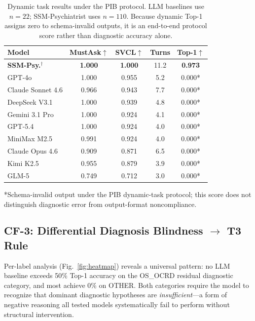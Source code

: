 \documentclass[conference]{IEEEtran}
\begin{document}
\begin{table}[htbp]
\caption{Dynamic task results under the PIB protocol. LLM baselines use $n=22$; SSM-Psychiatrist uses $n=110$. Because dynamic Top-1 assigns zero to schema-invalid outputs, it is an end-to-end protocol score rather than diagnostic accuracy alone.}
\label{tab:dynamic}
\begin{center}
\begin{tabular}{lcccc}
\toprule
\textbf{Model} & \textbf{MustAsk$\uparrow$} & \textbf{SVCL$\uparrow$} & \textbf{Turns} & \textbf{Top-1$\uparrow$} \\
\midrule
\rowcolor[gray]{0.88}
\textbf{SSM-Psy.}$^\dagger$ & \textbf{1.000} & \textbf{1.000} & 11.2 & \textbf{0.973} \\
\midrule
GPT-4o            & 1.000 & 0.955 & 5.2 & 0.000* \\
Claude Sonnet 4.6 & 0.966 & 0.943 & 7.7 & 0.000* \\
DeepSeek V3.1     & 1.000 & 0.939 & 4.8 & 0.000* \\
Gemini 3.1 Pro    & 1.000 & 0.924 & 4.1 & 0.000* \\
GPT-5.4           & 1.000 & 0.924 & 4.0 & 0.000* \\
MiniMax M2.5      & 0.991 & 0.924 & 4.0 & 0.000* \\
Claude Opus 4.6   & 0.909 & 0.871 & 6.5 & 0.000* \\
Kimi K2.5         & 0.955 & 0.879 & 3.9 & 0.000* \\
GLM-5             & 0.749 & 0.712 & 3.0 & 0.000* \\
\bottomrule
\end{tabular}
\end{center}
\footnotesize{*Schema-invalid output under the PIB dynamic-task protocol; this score does not distinguish diagnostic error from output-format noncompliance.}
\end{table}

\subsection{CF-3: Differential Diagnosis Blindness $\rightarrow$ T3 Rule}

Per-label analysis (Fig.~\ref{fig:heatmap}) reveals a universal pattern: no LLM baseline exceeds 50\% Top-1 accuracy on the OS\_OCRD residual diagnostic category, and most achieve 0\% on OTHER. Both categories require the model to recognize that dominant diagnostic hypotheses are \textit{insufficient}---a form of negative reasoning all tested models systematically fail to perform without structural intervention.
\end{document}
